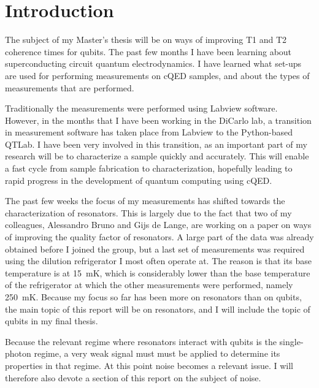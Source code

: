 \section*{Introduction}

The subject of my Master's thesis will be on ways of improving T1 and T2 coherence times for qubits. The past few months I have been learning about superconducting circuit quantum electrodynamics. I have learned what set-ups are used for performing measurements on cQED samples, and about the types of measurements that are performed.

Traditionally the measurements were performed using Labview software. However, in the months that I have been working in the DiCarlo lab, a transition in measurement software has taken place from Labview to the Python-based QTLab. I have been very involved in this transition, as an important part of my research will be to characterize a sample quickly and accurately. This will enable a fast cycle from sample fabrication to characterization, hopefully leading to rapid progress in the development of quantum computing using cQED.

The past few weeks the focus of my measurements has shifted towards the characterization of resonators. This is largely due to the fact that two of my colleagues, Alessandro Bruno and Gijs de Lange, are working on a paper on ways of improving the quality factor of resonators. A large part of the data was already obtained before I joined the group, but a last set of measurements was required using the dilution refrigerator I most often operate at. The reason is that its base temperature is at \SI{15}{\milli \kelvin}, which is considerably lower than the base temperature of the refrigerator at which the other measurements were performed, namely \SI{250}{\milli \kelvin}. Because my focus so far has been more on resonators than on qubits, the main topic of this report will be on resonators, and I will include the topic of qubits in my final thesis.

Because the relevant regime where resonators interact with qubits is the single-photon regime, a very weak signal must must be applied to determine its properties in that regime. At this point noise becomes a relevant issue. I will therefore also devote a section of this report on the subject of noise.

\newpage










